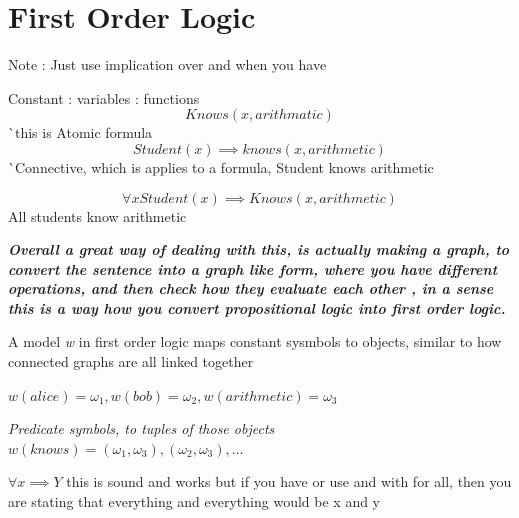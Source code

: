 \documentclass{article}
\theoremstyle{mytheoremstyle}
\theoremstyle{mytheoremstyle}
\theoremstyle{myproblemstyle}
\begin{document}
\section{First Order Logic}
Note : Just use implication over and
when you have
\begin{definition}
	Constant : variables : functions
	\begin{displaymath}
		Knows(x,arithmatic)
	\end{displaymath}
	^^ this is Atomic formula
	\begin{displaymath}
		Student(x) \implies  knows(x,arithmetic)
	\end{displaymath}
	^^ Connective, which is applies to a formula,
	Student knows arithmetic

	\begin{displaymath}
		\forall x Student(x) \implies Knows(x, arithmetic)
	\end{displaymath}
	All students know arithmetic



\end{definition}
\textbf{\textit{Overall a great way of dealing with this, is actually making a graph, to  convert the sentence into a graph like form, where you have different operations, and then check how they evaluate each other , in a sense this is a way how you convert propositional logic into first order logic.}}

\begin{definition}
	A model \textit{w} in first order logic maps constant sysmbols to objects, similar to how connected graphs are all linked together

	\begin{math}
		w(alice) = \omega _1 , w(bob) = \omega _2, w(arithmetic) = \omega _3
	\end{math}

	\textit{Predicate symbols, to tuples of those objects}
	\begin{math}
		w(knows) = {(\omega _1, \omega _3), (\omega _2,\omega _3), \ldots }
	\end{math}





\end{definition}
\begin{math}
	\forall x \implies Y
\end{math}
this is sound and works but if you have or use and with for all, then you are stating that everything and everything would be x and y
\end{document}
